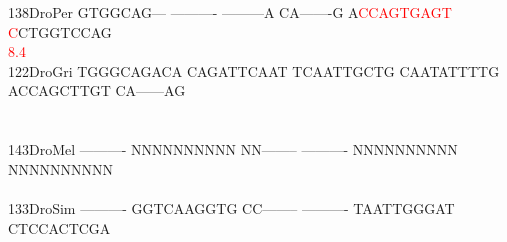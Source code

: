 \documentclass[11pt,twoside,reqno,a4paper]{article}
\begin{document}
{138\hspace*{1\charwidth}DroPer	GTGGCAG---	----------	---------A	CA-------G	A\textcolor{red}{C}\textcolor{red}{C}\textcolor{red}{A}\textcolor{red}{G}\textcolor{red}{T}\textcolor{red}{G}\textcolor{red}{A}\textcolor{red}{G}\textcolor{red}{T}	\textcolor{red}{C}CTGGTCCAG	\\
\hspace*{4\charwidth}\hspace*{7\charwidth}\hspace*{1\charwidth}\hspace*{1\charwidth}\hspace*{1\charwidth}\hspace*{1\charwidth}\hspace*{41\charwidth}\textcolor{red}{8.4}\hspace*{1\charwidth}\hspace*{1\charwidth}\\
122\hspace*{1\charwidth}DroGri	TGGGCAGACA	CAGATTCAAT	TCAATTGCTG	CAATATTTTG	ACCAGCTTGT	CA------AG	\\
\hspace*{4\charwidth}\hspace*{7\charwidth}\hspace*{1\charwidth}\hspace*{1\charwidth}\hspace*{1\charwidth}\hspace*{1\charwidth}\hspace*{1\charwidth}\hspace*{1\charwidth}\\
\\
143\hspace*{1\charwidth}DroMel	----------	NNNNNNNNNN	NN--------	----------	NNNNNNNNNN	NNNNNNNNNN	\\
\hspace*{4\charwidth}\hspace*{7\charwidth}\hspace*{1\charwidth}\hspace*{1\charwidth}\hspace*{1\charwidth}\hspace*{1\charwidth}\hspace*{1\charwidth}\hspace*{1\charwidth}\\
133\hspace*{1\charwidth}DroSim	----------	GGTCAAGGTG	CC--------	----------	TAATTGGGAT	CTCCACTCGA	\\
}
\end{document}
